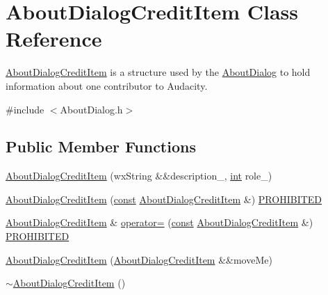 \hypertarget{struct_about_dialog_credit_item}{}\section{About\+Dialog\+Credit\+Item Class Reference}
\label{struct_about_dialog_credit_item}


\hyperlink{struct_about_dialog_credit_item}{About\+Dialog\+Credit\+Item} is a structure used by the \hyperlink{class_about_dialog}{About\+Dialog} to hold information about one contributor to Audacity.  




{\ttfamily \#include $<$About\+Dialog.\+h$>$}

\subsection*{Public Member Functions}
\begin{DoxyCompactItemize}
\item 
\hyperlink{struct_about_dialog_credit_item_a335aa8d955d29bc4e767fa6e6bae21b4}{About\+Dialog\+Credit\+Item} (wx\+String \&\&description\+\_\+, \hyperlink{xmltok_8h_a5a0d4a5641ce434f1d23533f2b2e6653}{int} role\+\_\+)
\item 
\hyperlink{struct_about_dialog_credit_item_af83c56c7bbe0a5049b321df3a740c6dd}{About\+Dialog\+Credit\+Item} (\hyperlink{getopt1_8c_a2c212835823e3c54a8ab6d95c652660e}{const} \hyperlink{struct_about_dialog_credit_item}{About\+Dialog\+Credit\+Item} \&) \hyperlink{_theme_8cpp_a035607ad9a746b2bf967980a50dd35db}{P\+R\+O\+H\+I\+B\+I\+T\+ED}
\item 
\hyperlink{struct_about_dialog_credit_item}{About\+Dialog\+Credit\+Item} \& \hyperlink{struct_about_dialog_credit_item_af261d324ba201713621817ee19d72da1}{operator=} (\hyperlink{getopt1_8c_a2c212835823e3c54a8ab6d95c652660e}{const} \hyperlink{struct_about_dialog_credit_item}{About\+Dialog\+Credit\+Item} \&) \hyperlink{_theme_8cpp_a035607ad9a746b2bf967980a50dd35db}{P\+R\+O\+H\+I\+B\+I\+T\+ED}
\item 
\hyperlink{struct_about_dialog_credit_item_af1a246bb48c43d2b7e291e1ef88c0db7}{About\+Dialog\+Credit\+Item} (\hyperlink{struct_about_dialog_credit_item}{About\+Dialog\+Credit\+Item} \&\&move\+Me)
\item 
\hyperlink{struct_about_dialog_credit_item_a6b3e51c8117300f11048d5c86e662ec9}{$\sim$\+About\+Dialog\+Credit\+Item} ()
\end{DoxyCompactItemize}
